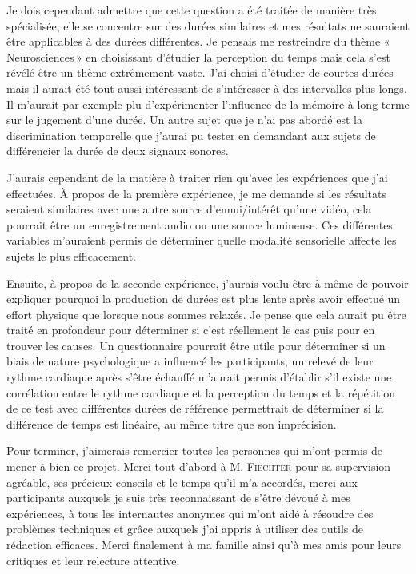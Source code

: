 \documentclass[12pt,fleqn,oneside,french,openany]{book} %
\begin{document}
Je dois cependant admettre que cette question a été traitée de manière très spécialisée, elle se concentre sur des durées similaires et mes résultats ne sauraient être applicables à des durées différentes. Je pensais me restreindre du thème «\,Neurosciences\,» en choisissant d'étudier la perception du temps mais cela s'est révélé être un thème extrêmement vaste. J'ai choisi d'étudier de courtes durées mais il aurait été tout aussi intéressant de s'intéresser à des intervalles plus longs. Il m'aurait par exemple plu d'expérimenter l'influence de la mémoire à long terme sur le jugement d'une durée. Un autre sujet que je n'ai pas abordé est la discrimination temporelle que j'aurai pu tester en demandant aux sujets de différencier la durée de deux signaux sonores.

J'aurais cependant de la matière à traiter rien qu'avec les expériences que j'ai effectuées. À propos de la première expérience, je me demande si les résultats seraient similaires avec une autre source d'ennui/intérêt qu'une vidéo, cela pourrait être un enregistrement audio ou une source lumineuse. Ces différentes variables m'auraient permis de déterminer quelle modalité sensorielle affecte les sujets le plus efficacement. 

Ensuite, à propos de la seconde expérience, j'aurais voulu être à même de pouvoir expliquer pourquoi la production de durées est plus lente après avoir effectué un effort physique que lorsque nous sommes relaxés. Je pense que cela aurait pu être traité en profondeur pour déterminer si c'est réellement le cas puis pour en trouver les causes. Un questionnaire pourrait être utile pour déterminer si un biais de nature psychologique a influencé les participants, un relevé de leur rythme cardiaque après s'être échauffé m'aurait permis d'établir s'il existe une corrélation entre le rythme cardiaque et la perception du temps et la répétition de ce test avec différentes durées de référence permettrait de déterminer si la différence de temps est linéaire, au même titre que son imprécision. 

Pour terminer, j'aimerais remercier toutes les personnes qui m'ont permis de mener à bien ce projet. Merci tout d'abord à M. \textsc{Fiechter} pour sa supervision agréable, ses précieux conseils et le temps qu'il m'a accordés, merci aux participants auxquels je suis très reconnaissant de s'être dévoué à mes expériences, à tous les internautes anonymes qui m'ont aidé à résoudre des problèmes techniques et grâce auxquels j'ai appris à utiliser des outils de rédaction efficaces. Merci finalement à ma famille ainsi qu'à mes amis pour leurs critiques et leur relecture attentive.
\end{document}
